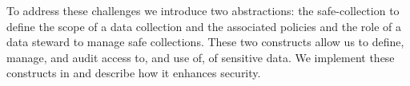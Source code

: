 To address these challenges we introduce two abstractions: 
the safe-collection to define the scope of a data collection
and the associated policies and the role of a data steward
to manage safe collections.  These two constructs allow us 
to define, manage, and audit access to, and use of, of 
sensitive data.  We implement these constructs in \NAME and
describe how it enhances security.  


%





